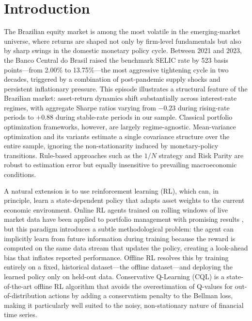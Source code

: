 \section{Introduction}
\label{sec:intro}

The Brazilian equity market is among the most volatile in the emerging-market
universe, where returns are shaped not only by firm-level fundamentals but also by
sharp swings in the domestic monetary policy cycle.
Between 2021 and 2023, the Banco Central do Brasil raised the benchmark SELIC rate by
523 basis points---from 2.00\% to 13.75\%---the most aggressive tightening cycle in
two decades, triggered by a combination of post-pandemic supply shocks and persistent
inflationary pressure.
This episode illustrates a structural feature of the Brazilian market: asset-return
dynamics shift substantially across interest-rate regimes, with aggregate Sharpe ratios
varying from $-0.23$ during rising-rate periods to $+0.88$ during stable-rate periods
in our sample.
Classical portfolio optimization frameworks, however, are largely regime-agnostic.
Mean-variance optimization \citep{Markowitz1952} and its variants estimate a single
covariance structure over the entire sample, ignoring the non-stationarity induced by
monetary-policy transitions.
Rule-based approaches such as the $1/N$ strategy \citep{DeMiguel2007} and Risk Parity
\citep{Qian2011} are robust to estimation error but equally insensitive to prevailing
macroeconomic conditions.

A natural extension is to use reinforcement learning (RL), which can, in principle,
learn a state-dependent policy that adapts asset weights to the current economic
environment.
Online RL agents trained on rolling windows of live market data have been applied to
portfolio management with promising results \citep{Jiang2017}, but this paradigm
introduces a subtle methodological problem: the agent can implicitly learn from
future information during training because the reward is computed on the same data
stream that updates the policy, creating a look-ahead bias that inflates reported
performance.
Offline RL \citep{Levine2020} resolves this by training entirely on a fixed, historical
dataset---the offline dataset---and deploying the learned policy only on held-out
data.
Conservative Q-Learning (CQL) \citep{Kumar2020} is a state-of-the-art offline RL
algorithm that avoids the overestimation of Q-values for out-of-distribution actions
by adding a conservatism penalty to the Bellman loss, making it particularly well
suited to the noisy, non-stationary nature of financial time series.

